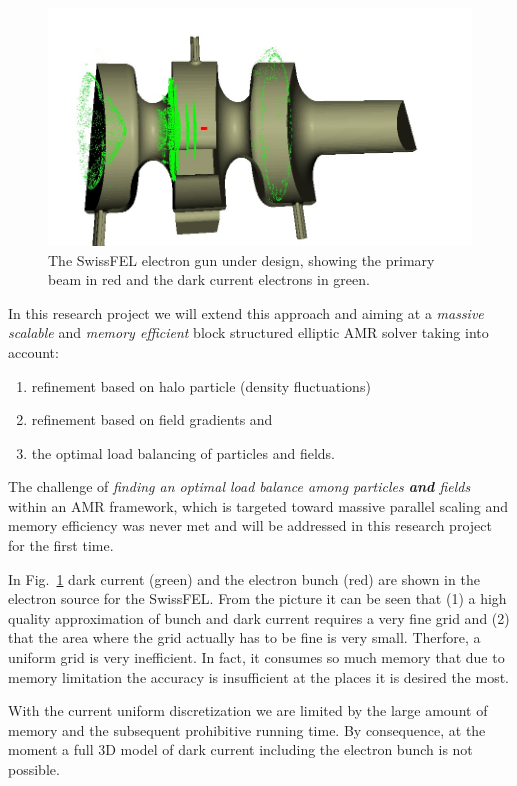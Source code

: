 \documentclass[11pt,pdftex]{article}
\begin{document}
\begin{figure}[hbt]
  \begin{center}
    \includegraphics[width=1.0\linewidth]{./figures/xfel-gun}
    \caption{The SwissFEL electron gun under design, showing the primary
      beam in red and the dark current electrons in green.}
    \label{fig:dc}
  \end{center}
\end{figure} 
In this research project we will extend this approach and aiming at a {\em massive scalable} and {\em memory
efficient} block structured elliptic AMR solver taking into account:
\begin{enumerate}
\item refinement based on halo particle (density fluctuations)
\item refinement based on field gradients and
\item the optimal load balancing of particles and fields.
\end{enumerate}
The challenge of \emph{finding an optimal load balance among particles
  \textbf{and} fields} within an AMR framework, which is targeted toward
massive parallel scaling and memory efficiency was never met and will be
addressed in this research project for the first time.

In Fig.~\ref{fig:dc} dark current (green) and the electron bunch (red)
are shown in the electron source for the SwissFEL.  From the picture it
can be seen that (1) a high quality approximation of bunch and dark
current requires a very fine grid and (2) that the area where the grid
actually has to be fine is very small.  Therfore, a uniform grid is very
inefficient.  In fact, it consumes so much memory that due to memory
limitation the accuracy is insufficient at the places it is desired the
most.

With the current uniform discretization we are limited by the large
amount of memory and the subsequent prohibitive running time.  By
consequence, at the moment a full 3D model of dark current including the
electron bunch is not possible.
\end{document}
